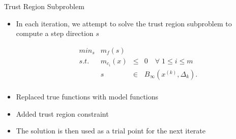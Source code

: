 \documentclass{beamer}
\newcommand{\xk}{{{x}^{(k)}}}
\newcommand{\dk}{{\Delta_k}}
\newcommand{\mk}{{m_f}}
\newcommand{\mck}{{m_{c_i}}}
\newcommand{\bk}{{B_{\infty}(\xk, \dk)}}
\begin{document}
\begin{frame}{Trust Region Subproblem}
    \begin{itemize}
        \item In each iteration, we attempt to solve the trust region subproblem to compute a step direction $s$

        \begin{displaymath}
\begin{array}{lrcc}
min_s & \mk(s)   &     &            \\
s.t.  &  \mck(x) & \le & 0   \quad \forall \; 1 \le i \le m       \\
      &  s & \in & \bk.  \\
\end{array}
        \end{displaymath}
        \item Replaced true functions with model functions
        \item Added trust region constraint
        \item The solution is then used as a trial point for the next iterate
    \end{itemize}
\end{frame}





\end{document}

